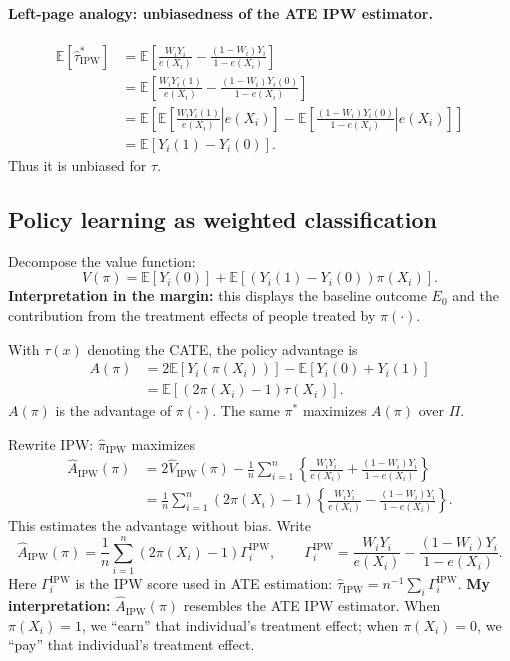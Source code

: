 \paragraph{Left-page analogy: unbiasedness of the ATE IPW estimator.}
\begin{align*}
 \mathbb E[\widehat\tau^*_{\mathrm{IPW}}]
 &=\mathbb E\left[\frac{W_iY_i}{e(X_i)}-
 \frac{(1-W_i)Y_i}{1-e(X_i)}\right]\\
 &=\mathbb E\left[\frac{W_iY_i(1)}{e(X_i)}-
 \frac{(1-W_i)Y_i(0)}{1-e(X_i)}\right]\\
 &=\mathbb E\left[
 \mathbb E\left[\left.\frac{W_iY_i(1)}{e(X_i)}\right|e(X_i)\right]
 -\mathbb E\left[\left.\frac{(1-W_i)Y_i(0)}{1-e(X_i)}\right|e(X_i)\right]
 \right]\\
 &=\mathbb E[Y_i(1)-Y_i(0)].
\end{align*}
Thus it is unbiased for $\tau$.

\subsection{Policy learning as weighted classification}
Decompose the value function:
\[
 V(\pi)=\mathbb E[Y_i(0)]+
 \mathbb E[(Y_i(1)-Y_i(0))\pi(X_i)].
\]
\textbf{Interpretation in the margin:} this displays the baseline outcome $E_0$ and the contribution from the treatment effects of people treated by $\pi(\cdot)$.

With $\tau(x)$ denoting the CATE, the policy advantage is
\begin{align*}
 A(\pi)&=2\mathbb E[Y_i(\pi(X_i))]-\mathbb E[Y_i(0)+Y_i(1)]\\
 &=\mathbb E[(2\pi(X_i)-1)\tau(X_i)].
\end{align*}
$A(\pi)$ is the advantage of $\pi(\cdot)$. The same $\pi^*$ maximizes $A(\pi)$ over $\Pi$.

Rewrite IPW: $\widehat\pi_{\mathrm{IPW}}$ maximizes
\begin{align*}
 \widehat A_{\mathrm{IPW}}(\pi)
 &=2\widehat V_{\mathrm{IPW}}(\pi)
 -\frac1n\sum_{i=1}^n\left\{
 \frac{W_iY_i}{e(X_i)}+\frac{(1-W_i)Y_i}{1-e(X_i)}\right\}\\
 &=\frac1n\sum_{i=1}^n(2\pi(X_i)-1)
 \left\{\frac{W_iY_i}{e(X_i)}-
 \frac{(1-W_i)Y_i}{1-e(X_i)}\right\}.\tag{11.10}
\end{align*}
This estimates the advantage without bias. Write
\[
 \widehat A_{\mathrm{IPW}}(\pi)
 =\frac1n\sum_{i=1}^n(2\pi(X_i)-1)\Gamma_i^{\mathrm{IPW}},
 \qquad
 \Gamma_i^{\mathrm{IPW}}=
 \frac{W_iY_i}{e(X_i)}-\frac{(1-W_i)Y_i}{1-e(X_i)}.\tag{11.11}
\]
Here $\Gamma_i^{\mathrm{IPW}}$ is the IPW score used in ATE estimation:
$\widehat\tau_{\mathrm{IPW}}=n^{-1}\sum_i\Gamma_i^{\mathrm{IPW}}$.
\textbf{My interpretation:} $\widehat A_{\mathrm{IPW}}(\pi)$ resembles the ATE IPW estimator. When $\pi(X_i)=1$, we ``earn'' that individual's treatment effect; when $\pi(X_i)=0$, we ``pay'' that individual's treatment effect.

